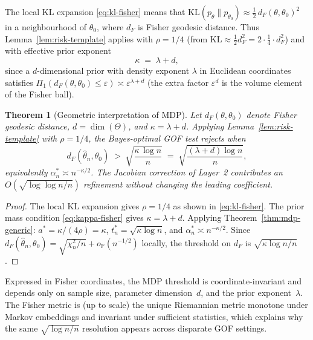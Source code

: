 \documentclass[11pt]{article}
\newcommand{\KL}{\mathrm{KL}}
\newcommand{\rhotail}{\rho}  %
\newcommand{\1}{\mathbf{1}}
\newcommand{\PP}{\mathbb{P}}
\theoremstyle{plain}
\newtheorem{theorem}{Theorem}[section]
\theoremstyle{definition}
\theoremstyle{remark}
\begin{document}
\noindent
The local KL expansion \eqref{eq:kl-fisher} means that $\KL(p_\theta\|p_{\theta_0}) \approx \tfrac{1}{2}\,d_F(\theta,\theta_0)^2$ in a neighbourhood of $\theta_0$, where $d_F$ is Fisher geodesic distance.
Thus Lemma~\ref{lem:risk-template} applies with $\rhotail = 1/4$ (from $\KL \approx \tfrac{1}{2}d_F^2 = 2\cdot\tfrac{1}{4}\cdot d_F^2$) and with effective prior exponent
\begin{equation}\label{eq:kappa-fisher}
\kappa \;=\; \lambda + d,
\end{equation}
since a $d$-dimensional prior with density exponent $\lambda$ in Euclidean coordinates satisfies $\Pi_1(d_F(\theta,\theta_0)\le\varepsilon) \asymp \varepsilon^{\lambda+d}$ (the extra factor $\varepsilon^d$ is the volume element of the Fisher ball).

\begin{theorem}[Geometric interpretation of MDP]\label{thm:fisher-mdp}
Let $d_F(\theta,\theta_0)$ denote Fisher geodesic distance, $d=\dim(\Theta)$, and $\kappa = \lambda + d$.
Applying Lemma~\ref{lem:risk-template} with $\rhotail=1/4$, the Bayes-optimal GOF test rejects when
\begin{equation}\label{eq:fisher-mdp}
d_F(\hat\theta_n,\theta_0) \;>\; \sqrt{\frac{\kappa\,\log n}{n}} \;=\; \sqrt{\frac{(\lambda + d)\log n}{n}},
\end{equation}
equivalently $\alpha_n^{*} \asymp n^{-\kappa/2}$.
The Jacobian correction of Layer~2 contributes an $O(\sqrt{\log\log n/n})$ refinement without changing the leading coefficient.
\end{theorem}

\begin{proof}
The local KL expansion gives $\rhotail=1/4$ as shown in \eqref{eq:kl-fisher}.
The prior mass condition \eqref{eq:kappa-fisher} gives $\kappa=\lambda+d$.
Applying Theorem~\ref{thm:mdp-generic}: $a^*=\kappa/(4\rhotail)=\kappa$, $t_n^*=\sqrt{\kappa\log n}$, and $\alpha_n^*\asymp n^{-\kappa/2}$.
Since $d_F(\hat\theta_n,\theta_0)=\sqrt{\chi_n^2/n}+o_\PP(n^{-1/2})$ locally, the threshold on $d_F$ is $\sqrt{\kappa\log n/n}$.
\end{proof}

Expressed in Fisher coordinates, the MDP threshold is coordinate-invariant and depends only on sample size, parameter dimension~$d$, and the prior exponent~$\lambda$.
The Fisher metric is (up to scale) the unique Riemannian metric monotone under Markov embeddings and invariant under sufficient statistics, which explains why the same $\sqrt{\log n/n}$ resolution appears across disparate GOF settings.
\end{document}
